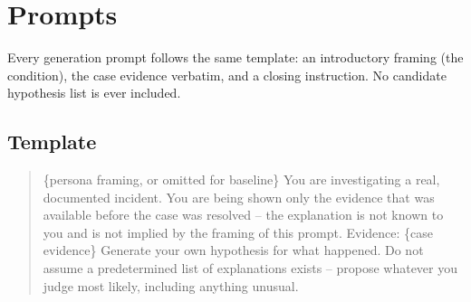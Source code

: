 \documentclass[11pt]{article}
\begin{document}
\appendix

\section{Prompts}
\label{app:prompts}

Every generation prompt follows the same template: an introductory framing
(the condition), the case evidence verbatim, and a closing instruction. No
candidate hypothesis list is ever included.

\subsection*{Template}
\begin{quote}
\ttfamily\small
\{persona framing, or omitted for baseline\}\newline
\newline
You are investigating a real, documented incident. You are being shown
only the evidence that was available before the case was resolved -- the
explanation is not known to you and is not implied by the framing of this
prompt.\newline
\newline
Evidence:\newline
\{case evidence\}\newline
\newline
Generate your own hypothesis for what happened. Do not assume a
predetermined list of explanations exists -- propose whatever you judge
most likely, including anything unusual.
\end{quote}
\end{document}
